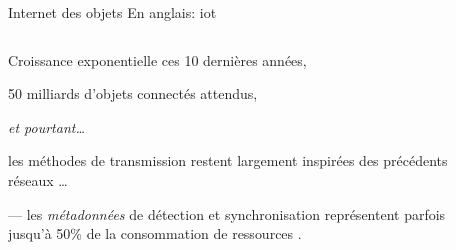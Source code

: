 \documentclass[../main.tex]{subfiles}
\begin{document}
\begin{frame}{Internet des objets}
  {En anglais: \acrfull{iot}}
  \begin{columns}
    \begin{column}{.55\linewidth}
      \begin{overlayarea}{\linewidth}{.6\textheight}
        \begin{ctrlitemize}{5pt}
          \item Croissance exponentielle ces 10 dernières années,
          \item 50 milliards d'objets connectés attendus,
        \end{ctrlitemize}

        \hspace{7 em} \emph{et pourtant\dots}

        \begin{ctrlitemize}{2pt}
          \item les méthodes de transmission restent largement inspirées des précédents réseaux \dots
          \item [---] {\scriptsize les \emph{métadonnées} de détection et synchronisation représentent parfois jusqu'à  50\% de la consommation de ressources \cite{durisiMassiveUltrareliableLowLatency2016}.}
        \end{ctrlitemize}
      \end{overlayarea}
    \end{column}
    \begin{column}{.4\linewidth}
      \begin{center}
      \end{center}
    \end{column}
  \end{columns}
\end{frame}
\end{document}

